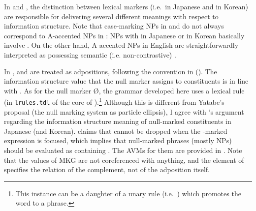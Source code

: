 In  and , the distinction between lexical
markers (i.e.\ \ga \vs \wa in Japanese and \ika \vs \nun in Korean)
are responsible for delivering several different meanings with respect
to information structure. Note that case-marking NPs in  and
 do not always correspond to A-accented NPs in
: NPs with \ga in Japanese or \ika in Korean
basically involve . On the other hand, A-accented NPs
in English are straightforwardly interpreted as possessing semantic
(i.e. non-contrastive) .









In , \ga and \wa are treated as adpositions,
following the convention in  (\citealt{siegel:bender:02}).
The information structure value that the null marker assigns to
constituents is in line with \citet{yatabe:99}.  As for the null
marker {\O}, the grammar developed here uses a lexical rule (in
\texttt{lrules.tdl} of the core of \lingo {}).\footnote{This instance can be a daughter of a unary rule
  (i.e.\ ) which promotes the word to a phrase.}
Although this is different from Yatabe's proposal (the null marking
system as particle ellipsis), I agree with \citeauthor{yatabe:99}'s
argument regarding the information structure meaning of null-marked
constituents in Japanese (and Korean). \citeauthor{yatabe:99} claims
that \ga cannot be dropped when the {\ga}-marked expression is
focused, which implies that null-marked phrases (mostly NPs) should be
evaluated as containing .  The AVMs for them are
provided in . Note that the values
of MKG are not coreferenced with anything, and the element of
 specifies the relation of the complement, not of the
adposition itself.




